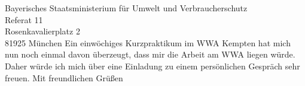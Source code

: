 \begin{letter}{%
Bayerisches Staatsministerium für Umwelt und Verbraucherschutz\\
Referat 11\\
Rosenkavalierplatz 2\\
81925 München%
}
Ein einwöchiges Kurzpraktikum im WWA Kempten hat mich nun noch einmal davon überzeugt, dass mir die Arbeit am WWA liegen würde. Daher würde ich mich über eine Einladung zu einem persönlichen Gespräch sehr freuen. 
\newline\newline\newline 
Mit freundlichen Grüßen\\\sig%
\encl{}
\end{letter}
